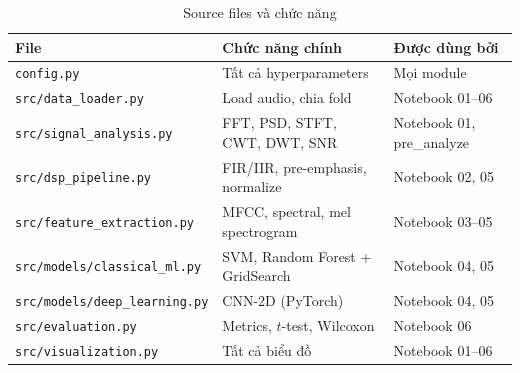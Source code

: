 \documentclass[12pt,a4paper]{article}
\begin{document}
\begin{table}[H]
\centering
\caption{Source files và chức năng}
\label{tab:source-files}
\small
\begin{tabular}{@{}lll@{}}
\toprule
\textbf{File} & \textbf{Chức năng chính} & \textbf{Được dùng bởi} \\
\midrule
\texttt{config.py}              & Tất cả hyperparameters            & Mọi module \\
\texttt{src/data\_loader.py}     & Load audio, chia fold             & Notebook 01--06 \\
\texttt{src/signal\_analysis.py} & FFT, PSD, STFT, CWT, DWT, SNR    & Notebook 01, pre\_analyze \\
\texttt{src/dsp\_pipeline.py}    & FIR/IIR, pre-emphasis, normalize  & Notebook 02, 05 \\
\texttt{src/feature\_extraction.py} & MFCC, spectral, mel spectrogram & Notebook 03--05 \\
\texttt{src/models/classical\_ml.py} & SVM, Random Forest + GridSearch & Notebook 04, 05 \\
\texttt{src/models/deep\_learning.py} & CNN-2D (PyTorch)              & Notebook 04, 05 \\
\texttt{src/evaluation.py}      & Metrics, $t$-test, Wilcoxon       & Notebook 06 \\
\texttt{src/visualization.py}   & Tất cả biểu đồ                   & Notebook 01--06 \\
\bottomrule
\end{tabular}
\end{table}
\end{document}
